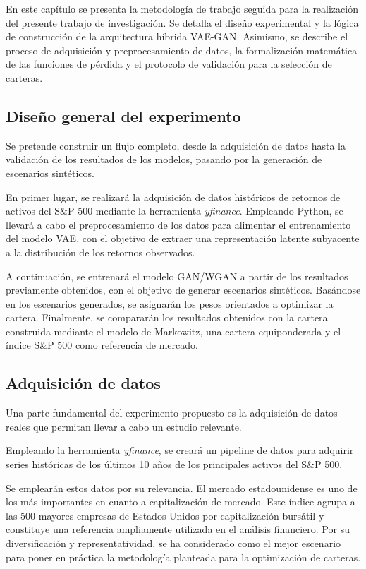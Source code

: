 En este capítulo se presenta la metodología de trabajo seguida para la realización del presente trabajo de investigación. Se detalla el diseño experimental y la lógica de construcción de la arquitectura híbrida VAE-GAN. Asimismo, se describe el proceso de adquisición y preprocesamiento de datos, la formalización matemática de las funciones de pérdida y el protocolo de validación para la selección de carteras.

\subsection{Diseño general del experimento}

Se pretende construir un flujo completo, desde la adquisición de datos hasta la validación de los resultados de los modelos, pasando por la generación de escenarios sintéticos.

En primer lugar, se realizará la adquisición de datos históricos de retornos de activos del S\&P 500 mediante la herramienta \textit{yfinance}. Empleando Python, se llevará a cabo el preprocesamiento de los datos para alimentar el entrenamiento del modelo VAE, con el objetivo de extraer una representación latente subyacente a la distribución de los retornos observados.

A continuación, se entrenará el modelo GAN/WGAN a partir de los resultados previamente obtenidos, con el objetivo de generar escenarios sintéticos. Basándose en los escenarios generados, se asignarán los pesos orientados a optimizar la cartera. Finalmente, se compararán los resultados obtenidos con la cartera construida mediante el modelo de Markowitz, una cartera equiponderada y el índice S\&P 500 como referencia de mercado.

\subsection{Adquisición de datos}

Una parte fundamental del experimento propuesto es la adquisición de datos reales que permitan llevar a cabo un estudio relevante.

Empleando la herramienta \textit{yfinance}, se creará un pipeline de datos para adquirir series históricas de los últimos 10 años de los principales activos del S\&P 500.

Se emplearán estos datos por su relevancia. El mercado estadounidense es uno de los más importantes en cuanto a capitalización de mercado. Este índice agrupa a las 500 mayores empresas de Estados Unidos por capitalización bursátil y constituye una referencia ampliamente utilizada en el análisis financiero. Por su diversificación y representatividad, se ha considerado como el mejor escenario para poner en práctica la metodología planteada para la optimización de carteras.

